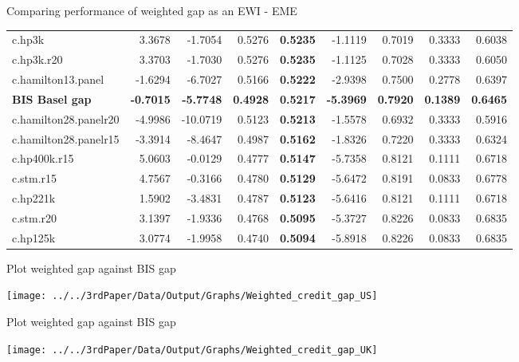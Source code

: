 \documentclass[
  ignorenonframetext,
]{beamer}
\begin{document}
\begin{frame}{Comparing performance of weighted gap as an EWI - EME}
{\begin{tabular}[t]{lrrr>{}rrrrr}
c.hp3k & 3.3678 & -1.7054 & 0.5276 & \textbf{0.5235} & -1.1119 & 0.7019 & 0.3333 & 0.6038\\
c.hp3k.r20 & 3.3703 & -1.7030 & 0.5276 & \textbf{0.5235} & -1.1125 & 0.7028 & 0.3333 & 0.6050\\
c.hamilton13.panel & -1.6294 & -6.7027 & 0.5166 & \textbf{0.5222} & -2.9398 & 0.7500 & 0.2778 & 0.6397\\
\textbf{BIS Basel gap} & \textbf{-0.7015} & \textbf{-5.7748} & \textbf{0.4928} & \textbf{\textbf{0.5217}} & \textbf{-5.3969} & \textbf{0.7920} & \textbf{0.1389} & \textbf{0.6465}\\
c.hamilton28.panelr20 & -4.9986 & -10.0719 & 0.5123 & \textbf{0.5213} & -1.5578 & 0.6932 & 0.3333 & 0.5916\\
\addlinespace
c.hamilton28.panelr15 & -3.3914 & -8.4647 & 0.4987 & \textbf{0.5162} & -1.8326 & 0.7220 & 0.3333 & 0.6324\\
c.hp400k.r15 & 5.0603 & -0.0129 & 0.4777 & \textbf{0.5147} & -5.7358 & 0.8121 & 0.1111 & 0.6718\\
c.stm.r15 & 4.7567 & -0.3166 & 0.4780 & \textbf{0.5129} & -5.6472 & 0.8191 & 0.0833 & 0.6778\\
c.hp221k & 1.5902 & -3.4831 & 0.4787 & \textbf{0.5123} & -5.6416 & 0.8121 & 0.1111 & 0.6718\\
c.stm.r20 & 3.1397 & -1.9336 & 0.4768 & \textbf{0.5095} & -5.3727 & 0.8226 & 0.0833 & 0.6835\\
\addlinespace
c.hp125k & 3.0774 & -1.9958 & 0.4740 & \textbf{0.5094} & -5.8918 & 0.8226 & 0.0833 & 0.6835\\
\bottomrule
\end{tabular}}
\end{frame}

\begin{frame}{Plot weighted gap against BIS gap}
\protect\hypertarget{plot-weighted-gap-against-bis-gap}{}
\begin{center}\texttt{[image: ../../3rdPaper/Data/Output/Graphs/Weighted\_credit\_gap\_US]} \end{center}
\end{frame}

\begin{frame}{Plot weighted gap against BIS gap}
\protect\hypertarget{plot-weighted-gap-against-bis-gap-1}{}
\begin{center}\texttt{[image: ../../3rdPaper/Data/Output/Graphs/Weighted\_credit\_gap\_UK]} \end{center}
\end{frame}
\end{document}

